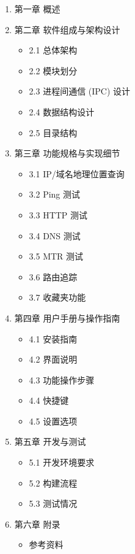 \documentclass{article}
\begin{document}
\begin{enumerate}[label=\arabic*.]
    \item 第一章 概述
    \item 第二章 软件组成与架构设计
    \begin{itemize}
        \item 2.1 总体架构
        \item 2.2 模块划分
        \item 2.3 进程间通信 (IPC) 设计
        \item 2.4 数据结构设计
        \item 2.5 目录结构
    \end{itemize}
    \item 第三章 功能规格与实现细节
    \begin{itemize}
        \item 3.1 IP/域名地理位置查询
        \item 3.2 Ping 测试
        \item 3.3 HTTP 测试
        \item 3.4 DNS 测试
        \item 3.5 MTR 测试
        \item 3.6 路由追踪
        \item 3.7 收藏夹功能
    \end{itemize}
    \item 第四章 用户手册与操作指南
    \begin{itemize}
        \item 4.1 安装指南
        \item 4.2 界面说明
        \item 4.3 功能操作步骤
        \item 4.4 快捷键
        \item 4.5 设置选项
    \end{itemize}
    \item 第五章 开发与测试
    \begin{itemize}
        \item 5.1 开发环境要求
        \item 5.2 构建流程
        \item 5.3 测试情况
    \end{itemize}
    \item 第六章 附录
    \begin{itemize}
        \item 参考资料
    \end{itemize}
\end{enumerate}
\end{document}
